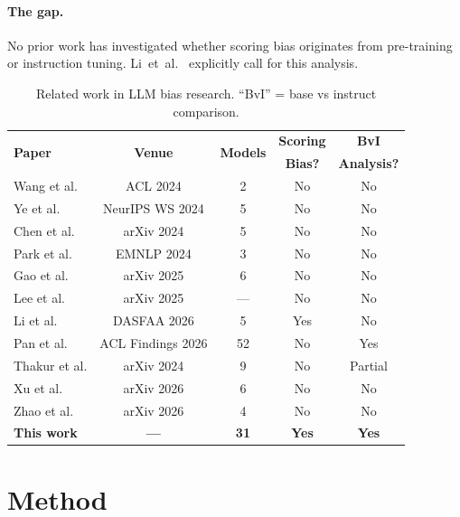 \documentclass[11pt,preprint,nonatbib]{article}
\begin{document}
\paragraph{The gap.}
No prior work has investigated whether scoring bias originates from pre-training or instruction tuning. Li~et~al.~\cite{li2025scoring} explicitly call for this analysis.

\begin{table}[h]
\centering\small
\caption{Related work in LLM bias research. ``BvI'' = base vs instruct comparison.}
\label{tab:related}
\begin{tabular}{lcccc}
\toprule
\multirow{2}{*}{\textbf{Paper}} & \multirow{2}{*}{\textbf{Venue}} & \multirow{2}{*}{\textbf{Models}} & \textbf{Scoring} & \textbf{BvI} \\
& & & \textbf{Bias?} & \textbf{Analysis?} \\
\midrule
Wang et al. \cite{wang2023large} & ACL 2024 & 2 & No & No \\
Ye et al. \cite{ye2024justice} & NeurIPS WS 2024 & 5 & No & No \\
Chen et al. \cite{chen2024humans} & arXiv 2024 & 5 & No & No \\
Park et al. \cite{park2024offsetbias} & EMNLP 2024 & 3 & No & No \\
Gao et al. \cite{gao2025evaluating} & arXiv 2025 & 6 & No & No \\
Lee et al. \cite{lee2025correctly} & arXiv 2025 & --- & No & No \\
Li et al. \cite{li2025scoring} & DASFAA 2026 & 5 & Yes & No \\
Pan et al. \cite{pan2025user} & ACL Findings 2026 & 52 & No & Yes \\
Thakur et al. \cite{thakur2024judging} & arXiv 2024 & 9 & No & Partial \\
Xu et al. \cite{xu2026position} & arXiv 2026 & 6 & No & No \\
Zhao et al. \cite{zhao2026bias} & arXiv 2026 & 4 & No & No \\
\midrule
\textbf{This work} & \textbf{---} & \textbf{31} & \textbf{Yes} & \textbf{Yes} \\
\bottomrule
\end{tabular}
\end{table}

\section{Method}
\end{document}
